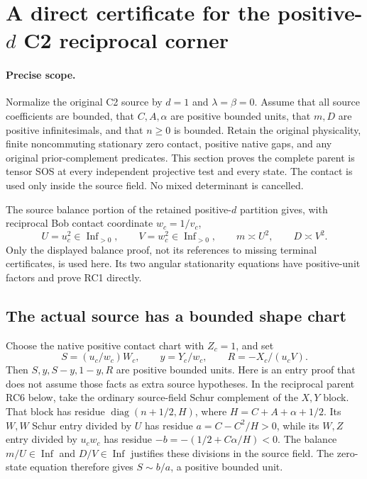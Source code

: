 \section{A direct certificate for the positive-$d$ C2 reciprocal corner}
\label{sec:new-rc-direct}

\paragraph{Precise scope.}
Normalize the original C2 source by $d=1$ and $\lambda=\beta=0$.
Assume that all source coefficients are bounded, that $C,A,\alpha$
are positive bounded units, that $m,D$ are positive infinitesimals,
and that $n\geq0$ is bounded. Retain the original physicality,
finite noncommuting stationary zero contact, positive native gaps,
and any original prior-complement predicates. This section proves
the complete parent is tensor SOS at every independent projective
test and every state. The contact is used only inside the source
field. No mixed determinant is cancelled.

The source balance portion of the retained positive-$d$ partition
gives, with reciprocal Bob contact coordinate $w_c=1/v_c$,
\[
 U=u_c^2\in\operatorname{Inf}_{>0},\qquad
 V=w_c^2\in\operatorname{Inf}_{>0},\qquad
 m\asymp U^2,\qquad D\asymp V^2.
 \tag{RC1}
\]
Only the displayed balance proof, not its references to missing
terminal certificates, is used here. Its two angular stationarity
equations have positive-unit factors and prove RC1 directly.

\subsection{The actual source has a bounded shape chart}

Choose the native positive contact chart with $Z_c=1$, and set
\[
 S=(u_c/w_c)W_c,\qquad y=Y_c/w_c,\qquad
 R=-X_c/(u_cV).
 \tag{RC2}
\]
Then $S,y,S-y,1-y,R$ are positive bounded units. Here is an entry
proof that does not assume those facts as extra source hypotheses.
In the reciprocal parent RC6 below, take the ordinary source-field
Schur complement of the $X,Y$ block. That block has residue
$\operatorname{diag}(n+1/2,H)$, where $H=C+A+\alpha+1/2$.
Its $W,W$ Schur entry divided by $U$ has residue
$a=C-C^2/H>0$, while its $W,Z$ entry divided by $u_cw_c$
has residue $-b=-(1/2+C\alpha/H)<0$. The balance
$m/U\in\operatorname{Inf}$ and $D/V\in\operatorname{Inf}$
justifies these divisions in the source field. The zero-state
equation therefore gives $S\sim b/a$, a positive bounded unit.

